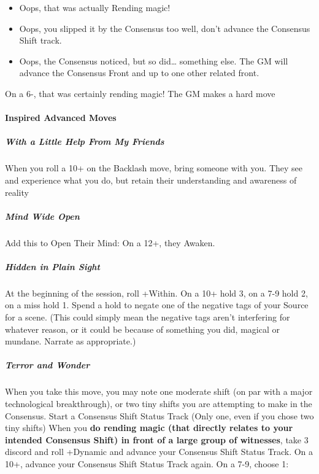 \documentclass[
]{article}
\begin{document}
\begin{itemize}
\item
  Oops, that was actually Rending magic!
\item
  Oops, you slipped it by the Consensus too well, don't advance the
  Consensus Shift track.
\item
  Oops, the Consensus noticed, but so did\ldots{} something else. The GM
  will advance the Consensus Front and up to one other related front.
\end{itemize}

On a 6-, that was certainly rending magic! The GM makes a hard move

\hypertarget{inspired-advanced-moves}{%
\paragraph{Inspired Advanced Moves}\label{inspired-advanced-moves}}

\hypertarget{with-a-little-help-from-my-friends}{%
\subparagraph{With a Little Help From My
Friends}\label{with-a-little-help-from-my-friends}}

When you roll a 10+ on the Backlash move, bring someone with you. They
see and experience what you do, but retain their understanding and
awareness of reality

\hypertarget{mind-wide-open}{%
\subparagraph{Mind Wide Open}\label{mind-wide-open}}

Add this to Open Their Mind: On a 12+, they Awaken.

\hypertarget{hidden-in-plain-sight}{%
\subparagraph{Hidden in Plain Sight}\label{hidden-in-plain-sight}}

At the beginning of the session, roll +Within. On a 10+ hold 3, on a 7-9
hold 2, on a miss hold 1. Spend a hold to negate one of the negative
tags of your Source for a scene. (This could simply mean the negative
tags aren't interfering for whatever reason, or it could be because of
something you did, magical or mundane. Narrate as appropriate.)

\hypertarget{terror-and-wonder}{%
\subparagraph{Terror and Wonder}\label{terror-and-wonder}}

When you take this move, you may note one moderate shift (on par with a
major technological breakthrough), or two tiny shifts you are attempting
to make in the Consensus. Start a Consensus Shift Status Track (Only
one, even if you chose two tiny shifts) When you \textbf{do rending
magic (that directly relates to your intended Consensus Shift) in front
of a large group of witnesses}, take 3 discord and roll +Dynamic and
advance your Consensus Shift Status Track. On a 10+, advance your
Consensus Shift Status Track again. On a 7-9, choose 1:
\end{document}
